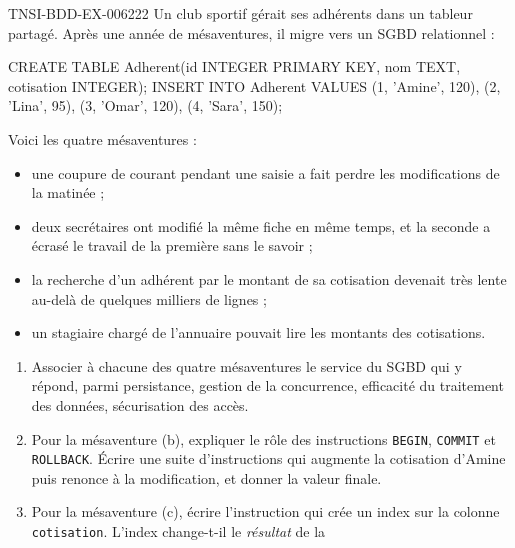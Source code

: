 \begin{exercice}{TNSI-BDD-EX-006}{2}{22}
Un club sportif gérait ses adhérents dans un tableur partagé. Après une année de
mésaventures, il migre vers un SGBD relationnel :
\begin{sql}
CREATE TABLE Adherent(id INTEGER PRIMARY KEY, nom TEXT, cotisation INTEGER);
INSERT INTO Adherent VALUES (1, 'Amine', 120), (2, 'Lina', 95),
                            (3, 'Omar', 120), (4, 'Sara', 150);
\end{sql}
Voici les quatre mésaventures :
\begin{itemize}
  \item[(a)] une coupure de courant pendant une saisie a fait perdre les
    modifications de la matinée ;
  \item[(b)] deux secrétaires ont modifié la même fiche en même temps, et la
    seconde a écrasé le travail de la première sans le savoir ;
  \item[(c)] la recherche d'un adhérent par le montant de sa cotisation devenait
    très lente au-delà de quelques milliers de lignes ;
  \item[(d)] un stagiaire chargé de l'annuaire pouvait lire les montants des
    cotisations.
\end{itemize}
\begin{enumerate}
  \item Associer à chacune des quatre mésaventures le service du SGBD qui y
    répond, parmi persistance, gestion de la concurrence, efficacité du
    traitement des données, sécurisation des accès.
  \item Pour la mésaventure (b), expliquer le rôle des instructions
    \lstinline{BEGIN}, \lstinline{COMMIT} et \lstinline{ROLLBACK}. Écrire une
    suite d'instructions qui augmente la cotisation d'Amine puis renonce à la
    modification, et donner la valeur finale.
  \item Pour la mésaventure (c), écrire l'instruction qui crée un index sur la
    colonne \lstinline{cotisation}. L'index change-t-il le \emph{résultat} de la

\end{enumerate}
\end{exercice}

